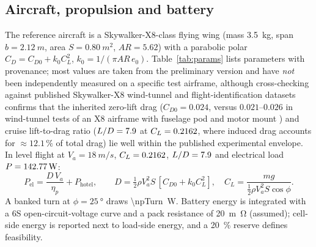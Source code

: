 \documentclass[preprint,12pt]{elsarticle}
\newcommand{\Va}{V_a}
\begin{document}
\subsection{Aircraft, propulsion and battery}
The reference aircraft is a Skywalker-X8-class flying wing (mass \SI{3.5}{kg}, span $b=\SI{2.12}{m}$, area $S=\SI{0.80}{m^2}$, $AR=5.62$) with a parabolic polar $C_D=C_{D0}+k_0C_L^2$, $k_0=1/(\pi AR\,e_0)$. Table~\ref{tab:params} lists parameters with provenance; most values are taken from the preliminary version and have \emph{not} been independently measured on a specific test airframe, although cross-checking against published Skywalker-X8 wind-tunnel and flight-identification datasets \cite{gryte2018,reinhardt2022} confirms that the inherited zero-lift drag ($C_{D0}=0.024$, versus $0.021$--$0.026$ in wind-tunnel tests of an X8 airframe with fuselage pod and motor mount \cite{gryte2018}) and cruise lift-to-drag ratio ($L/D=7.9$ at $C_L=0.2162$, where induced drag accounts for $\approx12.1\,\%$ of total drag) lie well within the published experimental envelope. In level flight at $\Va=\SI{18}{m/s}$, $C_L=0.2162$, $L/D=7.9$ and electrical load $P=\SI{142.77}{W}$:
\begin{equation}
P_{\mathrm{el}}=\frac{D\,\Va}{\eta_p}+P_{\mathrm{hotel}},\qquad D=\tfrac12\rho\Va^2S\,[C_{D0}+k_0C_L^2],\quad C_L=\frac{mg}{\tfrac12\rho\Va^2S\cos\phi}.
\end{equation}
A banked turn at $\phi=\SI{25}{\degree}$ draws \SI{\npTurn}{W}. Battery energy is integrated with a 6S open-circuit-voltage curve and a pack resistance of \SI{20}{m\ohm} (assumed); cell-side energy is reported next to load-side energy, and a \SI{20}{\percent} reserve defines feasibility.
\end{document}
